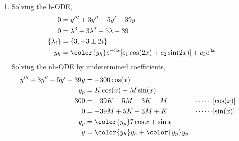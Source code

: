 \begin{enumerate}
    \item Solving the h-ODE,
          \begin{align}
              0               & = y''' + 3y'' - 5y' - 39y                          \\
              0               & = \lambda^{3} + 3\lambda^{2} - 5\lambda - 39       \\
              \{\lambda_{i}\} & = \{3, -3 \pm 2i\}                                 \\
              y_{h}           & = \color{y_h} e^{-3x}[c_1 \cos(2x) + c_2 \sin(2x)]
              + c_3 e^{3x}
          \end{align}
          Solving the nh-ODE by undetermined coefficients,
          \begin{align}
              y''' + 3y'' - 5y' - 39y & = -300\cos(x)                                 \\
              y_{p}                   & = K\cos(x) + M\sin(x)                         \\
              -300                    & = -39K - 5M - 3K - M                        &
              \cdots\cdots            & [\cos(x)]                                     \\
              0                       & = -39M + 5K - 3M + K                        &
              \cdots\cdots            & [\sin(x)]                                     \\
              y_{p}                   & = \color{y_p} 7\cos x + \sin x                \\
              y                       & = {\color{y_h} y_{h}} + {\color{y_p} y_{p}}
          \end{align}


\end{enumerate}
